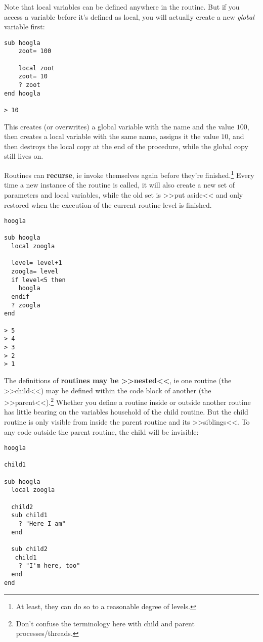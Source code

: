 Note that local variables can be defined anywhere in the routine. But if
you access a variable before it's defined as local, you will actually
create a new \emph{global} variable first:

\begin{lstlisting}
sub hoogla
	zoot= 100

	local zoot
	zoot= 10
	? zoot
end hoogla

> 10
\end{lstlisting}

This creates (or overwrites) a global variable with the name 
and the value $100$, then creates a local variable with the same name,
assigns it the value $10$, and then destroys the local copy at the end
of the procedure, while the global copy still lives on.

Routines can \textbf{recurse}, ie invoke themselves again before they're
finished.\footnote{At least, they can do so to a reasonable degree of
levels.}  Every time a new instance of the routine is
called, it will also create a new set of parameters and local variables,
while the old set is >>put aside<< and only restored when the execution
of the current routine level is finished.

\begin{lstlisting}
hoogla

sub hoogla
  local zoogla
  
  level= level+1
  zoogla= level
  if level<5 then
    hoogla
  endif
  ? zoogla
end

> 5
> 4
> 3
> 2
> 1
\end{lstlisting}

The definitions of \textbf{routines may be >>nested<<},  ie one routine (the >>child<<) may be defined within the code
block of another (the >>parent<<).\footnote{Don't confuse the
terminology here with child and parent processes/threads.} Whether you
define a routine inside or outside another routine has little bearing on
the variables household of the child routine. But the child routine is
only visible from inside the parent routine and its >>siblings<<. To any
code outside the parent routine, the child will be invisible:

\begin{lstlisting}
hoogla

child1

sub hoogla
  local zoogla

  child2
  sub child1
    ? "Here I am"
  end
  
  sub child2
   child1
	? "I'm here, too"
  end
end
\end{lstlisting}

